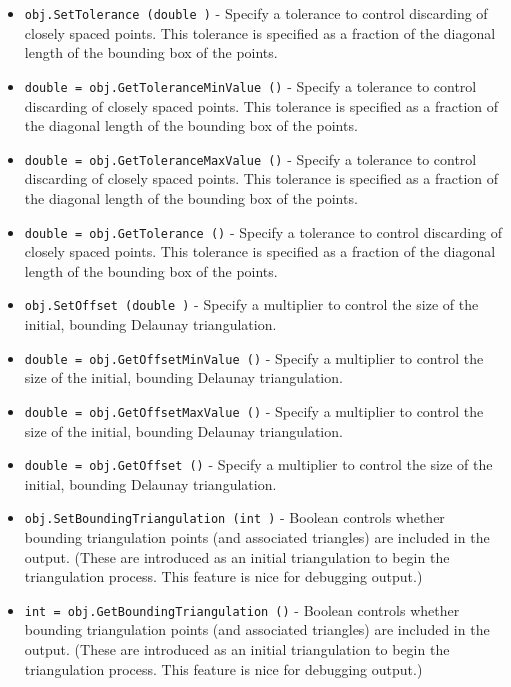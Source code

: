 \begin{itemize}
\item  \verb|obj.SetTolerance (double )| -  Specify a tolerance to control discarding of closely spaced points.
 This tolerance is specified as a fraction of the diagonal length of
 the bounding box of the points.

\item  \verb|double = obj.GetToleranceMinValue ()| -  Specify a tolerance to control discarding of closely spaced points.
 This tolerance is specified as a fraction of the diagonal length of
 the bounding box of the points.

\item  \verb|double = obj.GetToleranceMaxValue ()| -  Specify a tolerance to control discarding of closely spaced points.
 This tolerance is specified as a fraction of the diagonal length of
 the bounding box of the points.

\item  \verb|double = obj.GetTolerance ()| -  Specify a tolerance to control discarding of closely spaced points.
 This tolerance is specified as a fraction of the diagonal length of
 the bounding box of the points.

\item  \verb|obj.SetOffset (double )| -  Specify a multiplier to control the size of the initial, bounding
 Delaunay triangulation.

\item  \verb|double = obj.GetOffsetMinValue ()| -  Specify a multiplier to control the size of the initial, bounding
 Delaunay triangulation.

\item  \verb|double = obj.GetOffsetMaxValue ()| -  Specify a multiplier to control the size of the initial, bounding
 Delaunay triangulation.

\item  \verb|double = obj.GetOffset ()| -  Specify a multiplier to control the size of the initial, bounding
 Delaunay triangulation.

\item  \verb|obj.SetBoundingTriangulation (int )| -  Boolean controls whether bounding triangulation points (and associated
 triangles) are included in the output. (These are introduced as an
 initial triangulation to begin the triangulation process. This feature
 is nice for debugging output.)

\item  \verb|int = obj.GetBoundingTriangulation ()| -  Boolean controls whether bounding triangulation points (and associated
 triangles) are included in the output. (These are introduced as an
 initial triangulation to begin the triangulation process. This feature
 is nice for debugging output.)


\end{itemize}
